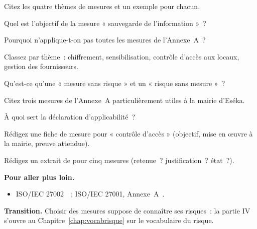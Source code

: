 \begin{boxexo}[title={\ding{45}\quad Exercice~10.2. Les quatre thèmes \niveaubase}]
Citez les quatre thèmes de mesures et un exemple pour chacun.
\end{boxexo}

\begin{boxexo}[title={\ding{45}\quad Exercice~10.3. Objectif d'une mesure \niveaubase}]
Quel est l'objectif de la mesure « sauvegarde de l'information »~?
\end{boxexo}

\begin{boxexo}[title={\ding{45}\quad Exercice~10.4. Mesure et risque \niveaumoyen}]
Pourquoi n'applique-t-on pas toutes les mesures de l'Annexe~A~?
\end{boxexo}

\begin{boxexo}[title={\ding{45}\quad Exercice~10.5. Classer des mesures \niveaumoyen}]
Classez par thème~: chiffrement, sensibilisation, contrôle d'accès aux locaux,
gestion des fournisseurs.
\end{boxexo}

\begin{boxexo}[title={\ding{45}\quad Exercice~10.6. Deux écarts \niveaumoyen}]
Qu'est-ce qu'une « mesure sans risque » et un « risque sans mesure »~?
\end{boxexo}

\begin{boxexo}[title={\ding{45}\quad Exercice~10.7. Mesures pour la mairie \niveaumoyen}]
Citez trois mesures de l'Annexe~A particulièrement utiles à la mairie d'Eséka.
\end{boxexo}

\begin{boxexo}[title={\ding{45}\quad Exercice~10.8. Rôle de la DdA \niveaumoyen}]
À quoi sert la déclaration d'applicabilité~?
\end{boxexo}

\begin{boxexo}[title={\ding{45}\quad Exercice~10.9. Fiche de mesure \niveauexpert}]
Rédigez une fiche de mesure pour « contrôle d'accès » (objectif, mise en
\oe uvre à la mairie, preuve attendue).
\end{boxexo}

\begin{boxexo}[title={\ding{45}\quad Exercice~10.10. Extrait de DdA \niveauexpert}]
Rédigez un extrait de  pour cinq mesures (retenue~? justification~?
état~?).
\end{boxexo}

\bigskip

\begin{boxinfo}
\textbf{Pour aller plus loin.}
\begin{itemize}
    \item ISO/IEC 27002~\cite{iso27002}~; ISO/IEC 27001, Annexe~A~\cite{iso27001}.
\end{itemize}
\end{boxinfo}

\begin{boxinfo}
\textbf{Transition.} Choisir des mesures suppose de connaître ses risques~: la
partie IV s'ouvre au Chapitre~\ref{chap:vocabrisque} sur le vocabulaire du
risque.
\end{boxinfo}
